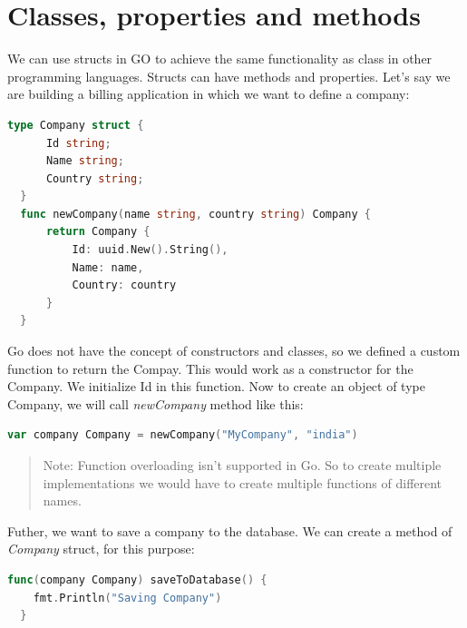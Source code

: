 \documentclass[12pt,a4paper]{report}
\begin{document}
\section*{Classes, properties and methods}
We can use structs in GO to achieve the same functionality as class in
other programming languages. Structs can have methods and properties.
Let's say we are building a billing application in which we want to define a company:
\begin{lstlisting}[language=Go]
  type Company struct {
      Id string;
      Name string;
      Country string;
  }
  func newCompany(name string, country string) Company {
      return Company {
          Id: uuid.New().String(),
          Name: name,
          Country: country
      }
  }
\end{lstlisting}
Go does not have the concept of constructors and classes, so we defined a
custom function to return the Compay. This would work as a constructor
for the Company. We initialize Id in this function.
Now to create an object of type Company, we will call \textit{newCompany} method
like this:
\begin{lstlisting}[language=Go]
  var company Company = newCompany("MyCompany", "india")
\end{lstlisting}
\begin{quote}
  Note: Function overloading isn't supported in Go. So to create multiple
  implementations we would have to create multiple functions of different names.
\end{quote}
Futher, we want to save a company to the database. We can create a method of \textit{Company} struct,
for this purpose:
\begin{lstlisting}[language=Go]
  func(company Company) saveToDatabase() {
    fmt.Println("Saving Company")
  }
\end{lstlisting}
\end{document}
